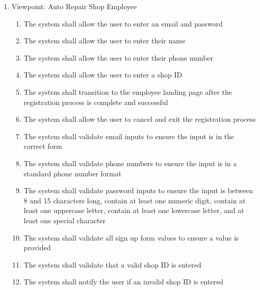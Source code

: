 \documentclass[12pt]{article}
\begin{document}
\begin{enumerate}[label=BE\arabic*., series=business_events]
\begin{enumerate}[VP\arabic*.]
		      \item Viewpoint: Auto Repair Shop Employee
		            \begin{enumerate}
			            \item The system shall allow the user to enter an email and password
			            \item The system shall allow the user to enter their name
			            \item The system shall allow the user to enter their phone number
			            \item The system shall allow the user to enter a shop ID
			            \item The system shall transition to the employee landing page after the registration process is complete
			                  and successful
			            \item The system shall allow the user to cancel and exit the registration process
			            \item The system shall validate email inputs to ensure the input is in the correct form
			            \item The system shall validate phone numbers to ensure the input is in a standard phone number format
			            \item The system shall validate password inputs to ensure the input is between 8 and 15 characters long,
			                  contain at least one numeric digit, contain at least one uppercase letter, contain at least one
			                  lowercase letter, and at least one special character
			            \item The system shall validate all sign up form values to ensure a value is provided
			            \item The system shall validate that a valid shop ID is entered
			            \item The system shall notify the user if an invalid shop ID is entered
		            \end{enumerate}
	      \end{enumerate}


\end{enumerate}
\end{document}

